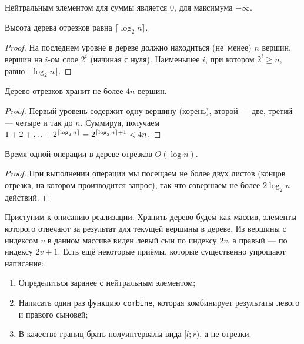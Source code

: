 \begin{example}
    Нейтральным элементом для суммы является $0$, для максимума $-\infty$.
\end{example}

\begin{theorem}
    Высота дерева отрезков равна $\lceil\log_2n\rceil$.
\end{theorem}

\begin{proof}
    На последнем уровне в дереве должно находиться (не~менее) $n$ вершин, вершин на $i$-ом слое $2^i$ (начиная с нуля). Наименьшее $i$, при котором $2^i \geqslant n$, равно $\lceil\log_2n\rceil$.
\end{proof}

\begin{corollary}
    Дерево отрезков хранит не более $4n$ вершин.
\end{corollary}

\begin{proof}
    Первый уровень содержит одну вершину (корень), второй --- две, третий --- четыре и так до $n$. Суммируя, получаем $1 + 2 \hm + \ldots + 2^{\lceil\log_2n\rceil} = 2^{\lceil\log_2n\rceil + 1} < 4n$.
\end{proof}

\begin{corollary}
    Время одной операции в дереве отрезков $O(\log n)$.
\end{corollary}

\begin{proof}
    При выполнении операции мы посещаем не более двух листов (концов отрезка, на котором производится запрос), так что совершаем не более $2\log_2 n$ действий.
\end{proof}

Приступим к описанию реализации. Хранить дерево будем как массив, элементы которого отвечают за результат для текущей вершины в дереве. Из вершины с индексом $v$ в данном массиве виден левый сын по индексу $2v$, а правый --- по индексу $2v + 1$. Есть ещё некоторые приёмы, которые существенно упрощают написание:

\begin{enumerate}[nolistsep]
    \item Определиться заранее с нейтральным элементом;
    \item Написать один раз функцию \texttt{combine}, которая комбинирует результаты левого и правого сыновей;
    \item В качестве границ брать полуинтервалы вида $[l; r)$, а не отрезки.
\end{enumerate}

